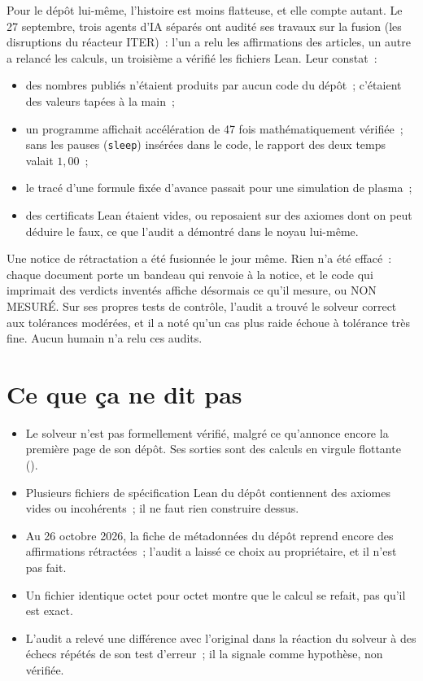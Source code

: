 Pour le dépôt lui-même, l'histoire est moins flatteuse, et elle compte autant. Le 27 septembre, trois agents d'IA
séparés ont audité ses travaux sur la fusion (les disruptions du réacteur ITER)~: l'un a relu les affirmations des
articles, un autre a relancé les calculs, un troisième a vérifié les fichiers Lean. Leur constat~:
\begin{itemize}
\item des nombres publiés n'étaient produits par aucun code du dépôt~; c'étaient des valeurs tapées à la main~;
\item un programme affichait \og accélération de 47 fois mathématiquement vérifiée\fg~; sans les pauses
  (\texttt{sleep}) insérées dans le code, le rapport des deux temps valait $1{,}00$~;
\item le tracé d'une formule fixée d'avance passait pour une \og simulation\fg{} de plasma~;
\item des \og certificats\fg{} Lean étaient vides, ou reposaient sur des axiomes dont on peut déduire le faux,
  ce que l'audit a démontré dans le noyau lui-même.
\end{itemize}
Une notice de rétractation a été fusionnée le jour même. Rien n'a été effacé~: chaque document porte un bandeau qui
renvoie à la notice, et le code qui imprimait des verdicts inventés affiche désormais ce qu'il mesure, ou \og NON
MESURÉ\fg. Sur ses propres tests de contrôle, l'audit a trouvé le solveur correct aux tolérances modérées, et il a
noté qu'un cas plus raide échoue à tolérance très fine. Aucun humain n'a relu ces audits.

\section*{Ce que ça ne dit pas}

\begin{limite}
\begin{itemize}
\item Le solveur n'est pas \og formellement vérifié\fg, malgré ce qu'annonce encore la première page de son dépôt.
  Ses sorties sont des calculs en virgule flottante ().
\item Plusieurs fichiers de spécification Lean du dépôt contiennent des axiomes vides ou incohérents~; il ne faut
  rien construire dessus.
\item Au 26 octobre 2026, la fiche de métadonnées du dépôt reprend encore des affirmations rétractées~; l'audit a
  laissé ce choix au propriétaire, et il n'est pas fait.
\item Un fichier identique octet pour octet montre que le calcul se refait, pas qu'il est exact.
\item L'audit a relevé une différence avec l'original dans la réaction du solveur à des échecs répétés de son
  test d'erreur~; il la signale comme hypothèse, non vérifiée.
\end{itemize}
\end{limite}

